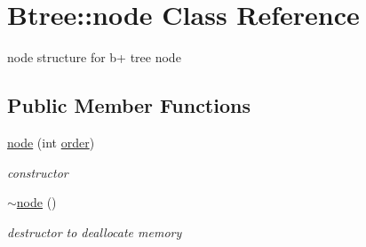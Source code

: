 \hypertarget{class_btree_1_1node}{\section{Btree\-:\-:node Class Reference}
\label{class_btree_1_1node}
}


node structure for b+ tree node  


\subsection*{Public Member Functions}
\begin{DoxyCompactItemize}
\item 
\hyperlink{class_btree_1_1node_aac7baea958f0b2c9f411e3ab83c8a51c}{node} (int \hyperlink{class_btree_1_1node_a8a5ff91fd8e251549f3e2c70c04765b7}{order})
\begin{DoxyCompactList}\small\item\em constructor \end{DoxyCompactList}\item 
\hyperlink{class_btree_1_1node_ae325c7681040fd73734b55d85ea982f4}{$\sim$node} ()
\begin{DoxyCompactList}\small\item\em destructor to deallocate memory \end{DoxyCompactList}\end{DoxyCompactItemize}
